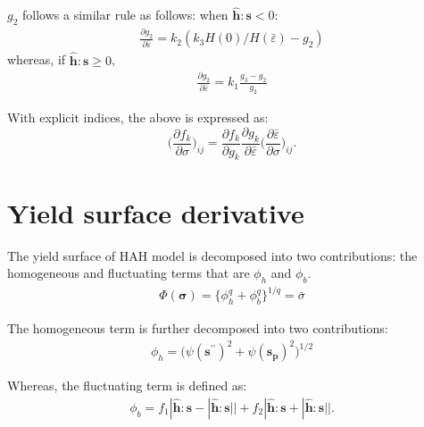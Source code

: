 \documentclass[12pt]{amsart}
\begin{document}
$g_2$ follows a similar rule as follows:
when  $\hat{\mathbf{h}}:\mathbf{s}<0$:
\begin{eqnarray}
  \label{eq:dbau4}
  \frac{\partial{g_2}}{\partial{\bar{\varepsilon}}}=k_2 (k_3 H(0)/H(\bar{\varepsilon})-g_2)
\end{eqnarray}
whereas, if $\hat{\mathbf{h}}:\mathbf{s}\ge0$,
\begin{eqnarray}
  \label{eq:dbau5}
  \frac{\partial{g_2}}{\partial{\bar{\varepsilon}}}=k_1 \frac{g_3-g_2}{g_2}
\end{eqnarray}

With explicit indices, the above is expressed as:
\begin{equation}
  \label{eq:dphib8}
  \bigg(\frac{\partial f_k}{\partial \sigma}\bigg)_{ij} = \frac{\partial f_k}{\partial g_k} \frac{\partial g_k}{\partial \bar{\varepsilon}}  \bigg(\frac{\partial\bar{\varepsilon}}{\partial\sigma}\bigg)_{ij}.
\end{equation}


\newpage
\section{Yield surface derivative}


The yield surface of HAH model is decomposed into two contributions: the homogeneous and fluctuating terms that are $\phi_h$ and $\phi_b$.
\begin{eqnarray}
  \label{eq:hah_def}
  \Phi(\mathbf{\sigma})=\{\phi_h^q + \phi_b^q \}^{1/q}=\bar{\sigma}
\end{eqnarray}

The homogeneous term is further decomposed into two contributions:
\begin{eqnarray}
  \label{eq:hah_homo}
  \phi_h = \big(\psi(\mathbf{s}^{\prime\prime})^2+\psi(\mathbf{s_p})^2\big)^{1/2}
\end{eqnarray}

Whereas, the fluctuating term is defined as:
\begin{eqnarray}
    \label{eq:fluc}
\phi_b  = f_1|\hat{\mathbf{h}}:\mathbf{s} - |\hat{\mathbf{h}}:\mathbf{s}||    + f_2|\hat{\mathbf{h}}:\mathbf{s} + |\hat{\mathbf{h}}:\mathbf{s}||.
\end{eqnarray}
\end{document}
